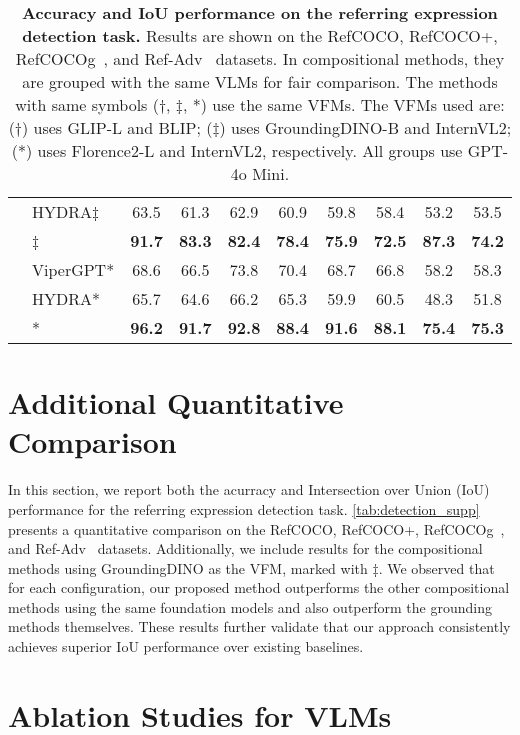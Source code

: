 \begin{table*}[t]
{\begin{tabular}{c|l|cc|cc|cc|cc}
& HYDRA‡ & 63.5 & 61.3 & 62.9 & 60.9 & 59.8 & 58.4 & 53.2 & 53.5 \\
& \methodname{}‡ & \textbf{91.7} & \textbf{83.3} & \textbf{82.4} & \textbf{78.4} & \textbf{75.9} & \textbf{72.5} & \textbf{87.3} & \textbf{74.2} \\ \cline{2-10}
& ViperGPT* & 68.6 & 66.5 & 73.8 & 70.4 & 68.7 & 66.8 & 58.2 & 58.3 \\
& HYDRA* & 65.7 & 64.6 & 66.2 & 65.3 & 59.9 & 60.5 & 48.3 & 51.8 \\
& \methodname{}* & \textbf{96.2} & \textbf{91.7} & \textbf{92.8} & \textbf{88.4} & \textbf{91.6} & \textbf{88.1} & \textbf{75.4} & \textbf{75.3} \\
\bottomrule[0.4mm]
\end{tabular}}
\caption{\textbf{Accuracy and IoU performance on the referring expression detection task.} Results are shown on the RefCOCO, RefCOCO+, RefCOCOg~\cite{kazemzadeh_referitgame_2014}, and Ref-Adv~\cite{akula_words_2020} datasets. In compositional methods, they are grouped with the same VLMs for fair comparison. The methods with same symbols (†, ‡, *) use the same VFMs. The VFMs used are: (†) uses GLIP-L and BLIP; (‡) uses GroundingDINO-B and InternVL2; (*) uses Florence2-L and InternVL2, respectively. All groups use GPT-4o Mini.}
\label{tab:detection_supp}
\end{table*}

\section{Additional Quantitative Comparison}
\label{sec:supp_quantitative}

In this section, we report both the acurracy and Intersection over Union (IoU) performance for the referring expression detection task. \autoref{tab:detection_supp} presents a quantitative comparison on the RefCOCO, RefCOCO+, RefCOCOg~\cite{kazemzadeh_referitgame_2014}, and Ref-Adv~\cite{akula_words_2020} datasets. Additionally, we include results for the compositional methods using GroundingDINO as the VFM, marked with ‡. We observed that for each configuration, our proposed method \methodname{} outperforms the other compositional methods using the same foundation models and also outperform the grounding methods themselves. These results further validate that our approach consistently achieves superior IoU performance over existing baselines.

\section{Ablation Studies for VLMs}
\label{sec:supp_vlm}

